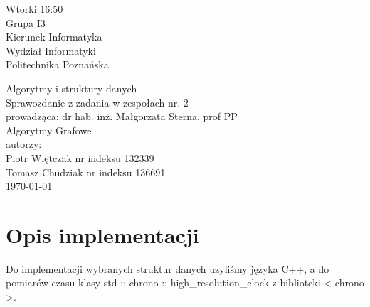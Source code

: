 \documentclass[polish,polish,a4paper]{article}
\begin{document}
	
		\begin{titlepage}
			\begin{flushright}
				{ Wtorki 16:50\\
					Grupa I3\\
					Kierunek Informatyka\\
					Wydział Informatyki\\
					Politechnika Poznańska}
			\end{flushright}
		\vspace*{\fill}
		\begin{center}
			{\Large Algorytmy i struktury danych \\[0.1cm]
				Sprawozdanie z zadania w zespołach nr. 2\\[0.1cm]
				prowadząca: dr hab. inż. Małgorzata Sterna, prof PP}\\
			{\Huge Algorytmy  Grafowe\\ [0.4cm]}
			{\large autorzy:\\[0.1cm]}
			{\large Piotr Więtczak nr indeksu 132339\\[0.1cm] Tomasz Chudziak nr indeksu 136691}\\[0.5cm]
			\today
		\end{center}
		\vspace*{\fill}
	\end{titlepage}

\section{Opis implementacji }

Do implementacji wybranych struktur danych uzyliśmy języka C++, a do pomiarów czasu klasy std :: chrono :: high\_resolution\_clock z biblioteki < chrono >.
\end{document}
